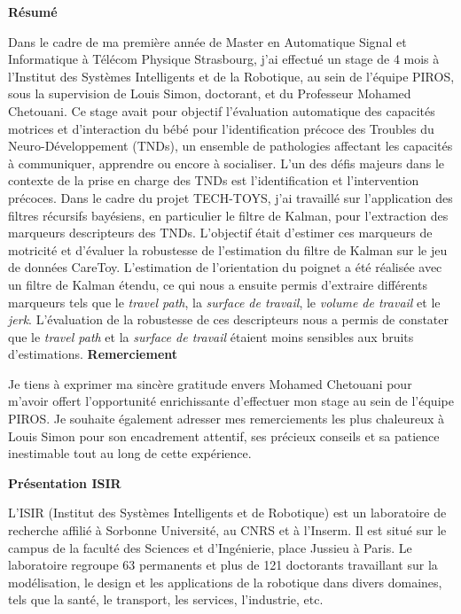 \documentclass[5pt]{article}
\begin{document}
\Large \textbf{Résumé}
\par
Dans le cadre de ma première année de Master en Automatique Signal et Informatique à Télécom Physique Strasbourg, j'ai effectué un stage de 4 mois à l'Institut des Systèmes Intelligents et de la Robotique, au sein de l'équipe PIROS, sous la supervision de Louis Simon, doctorant, et du Professeur Mohamed Chetouani. Ce stage avait pour objectif l'évaluation automatique des capacités motrices et d'interaction du bébé pour l'identification précoce des Troubles du Neuro-Développement (TNDs), un ensemble de pathologies affectant les capacités à communiquer, apprendre ou encore à socialiser. L'un des défis majeurs dans le contexte de la prise en charge des TNDs est l'identification et l'intervention précoces. Dans le cadre du projet TECH-TOYS, j'ai travaillé sur l'application des filtres récursifs bayésiens, en particulier le filtre de Kalman, pour l'extraction des marqueurs descripteurs des TNDs. L'objectif était d'estimer ces marqueurs de motricité et d'évaluer la robustesse de l'estimation du filtre de Kalman sur le jeu de données CareToy. L'estimation de l'orientation du poignet a été réalisée avec un filtre de Kalman étendu, ce qui nous a ensuite permis d'extraire différents marqueurs tels que le \textit{travel path}, la \textit{surface de travail}, le \textit{volume de travail} et le \textit{jerk}. L'évaluation de la robustesse de ces descripteurs nous a permis de constater que le \textit{travel path} et la \textit{surface de travail} étaient moins sensibles aux bruits d'estimations.
\newpage
\pagestyle{empty}
\clearpage
\Large \textbf{Remerciement}
\par
Je tiens à exprimer ma sincère gratitude envers Mohamed Chetouani pour m'avoir offert l'opportunité enrichissante d'effectuer mon stage au sein de l'équipe PIROS. Je souhaite également adresser mes remerciements les plus chaleureux à Louis Simon pour son encadrement attentif, ses précieux conseils et sa patience inestimable tout au long de cette expérience.
 
\newpage
\pagestyle{empty}
\tableofcontents

\newpage
\pagestyle{empty}
\listoffigures

\newpage
\pagestyle{empty}
\clearpage
\Large \textbf{Présentation ISIR}

L'ISIR (Institut des Systèmes Intelligents et de Robotique) est un laboratoire de recherche affilié à Sorbonne Université, au CNRS et à l'Inserm. Il est situé sur le campus de la faculté des Sciences et d'Ingénierie, place Jussieu à Paris. Le laboratoire regroupe 63 permanents et plus de 121 doctorants travaillant sur la modélisation, le design et les applications de la robotique dans divers domaines, tels que la santé, le transport, les services, l'industrie, etc.
\end{document}
